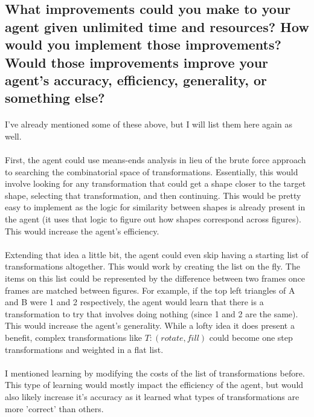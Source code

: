 \documentclass[12pt]{article}
\begin{document}
\subsection{What improvements could you make to your agent given unlimited time and resources? How would you implement those improvements? Would those improvements improve your agent’s accuracy, efficiency, generality, or something else?}
\paragraph{}
I've already mentioned some of these above, but I will list them here again as well.
\paragraph{}
First, the agent could use means-ends analysis in lieu of the brute force approach to searching the combinatorial space of transformations. Essentially, this would involve looking for any transformation that could get a shape closer to the target shape, selecting that transformation, and then continuing. This would be pretty easy to implement as the logic for similarity between shapes is already present in the agent (it uses that logic to figure out how shapes correspond across figures). This would increase the agent's efficiency. 

\paragraph{}
Extending that idea a little bit, the agent could even skip having a starting list of transformations altogether. This would work by creating the list on the fly. The items on this list could be represented by the difference between two frames once frames are matched between figures. For example, if the top left triangles of A and B were 1 and 2 respectively, the agent would learn that there is a transformation to try that involves doing nothing (since 1 and 2 are the same). This would increase the agent's generality. While a lofty idea it does present a benefit, complex transformations like $T:(rotate, fill)$ could become one step transformations and weighted in a flat list.

\paragraph{}
I mentioned learning by modifying the costs of the list of transformations before. This type of learning would mostly impact the efficiency of the agent, but would also likely increase it's accuracy as it learned what types of transformations are more 'correct' than others.
\end{document}
